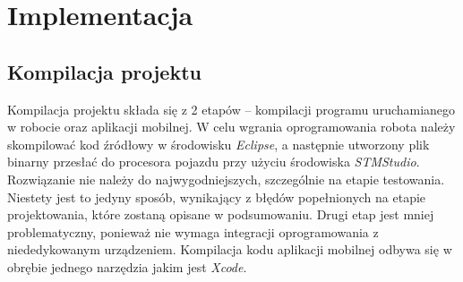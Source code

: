 \chapter{Implementacja}
\section{Kompilacja projektu}
Kompilacja projektu składa się z 2 etapów – kompilacji programu uruchamianego w robocie oraz aplikacji mobilnej. W celu wgrania oprogramowania robota należy skompilować kod źródłowy w środowisku \textit{Eclipse}, a następnie utworzony plik binarny przesłać do procesora pojazdu przy użyciu środowiska \textit{STMStudio}. Rozwiązanie nie należy do najwygodniejszych, szczególnie na etapie testowania. Niestety jest to jedyny sposób, wynikający z błędów popełnionych na etapie projektowania, które zostaną opisane w podsumowaniu. Drugi etap jest mniej problematyczny, ponieważ nie wymaga integracji oprogramowania z niededykowanym urządzeniem.  Kompilacja kodu aplikacji mobilnej odbywa się w obrębie jednego narzędzia jakim jest \textit{Xcode}. 